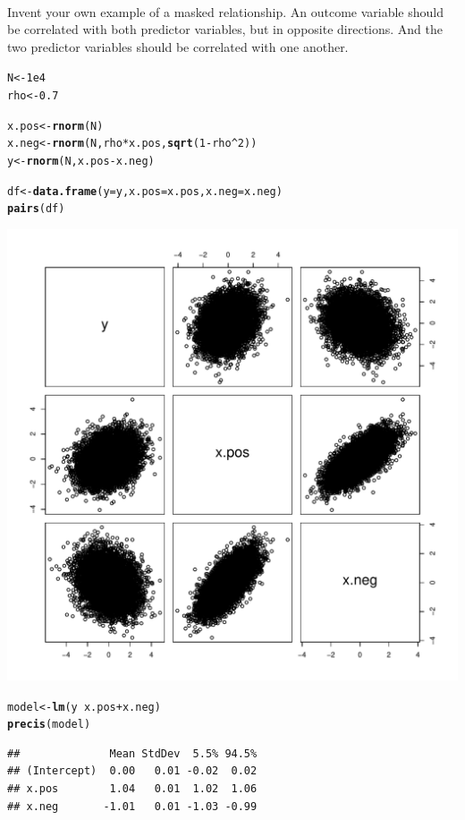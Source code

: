 \documentclass[12pt]{article}\usepackage[]{graphicx}\usepackage[]{color}
\makeatletter
\def\maxwidth{ %
  \ifdim\Gin@nat@width>\linewidth
    \linewidth
  \else
    \Gin@nat@width
  \fi
}
\newcommand{\hlnum}[1]{\textcolor[rgb]{0.686,0.059,0.569}{#1}}%
\newcommand{\hlopt}[1]{\textcolor[rgb]{0,0,0}{#1}}%
\newcommand{\hlstd}[1]{\textcolor[rgb]{0.345,0.345,0.345}{#1}}%
\newcommand{\hlkwb}[1]{\textcolor[rgb]{0.69,0.353,0.396}{#1}}%
\newcommand{\hlkwc}[1]{\textcolor[rgb]{0.333,0.667,0.333}{#1}}%
\newcommand{\hlkwd}[1]{\textcolor[rgb]{0.737,0.353,0.396}{\textbf{#1}}}%
\newenvironment{kframe}{%
 \def\at@end@of@kframe{}%
 \ifinner\ifhmode%
  \def\at@end@of@kframe{\end{minipage}}%
  \begin{minipage}{\columnwidth}%
 \fi\fi%
 \def\FrameCommand##1{\hskip\@totalleftmargin \hskip-\fboxsep
 \colorbox{shadecolor}{##1}\hskip-\fboxsep
     \hskip-\linewidth \hskip-\@totalleftmargin \hskip\columnwidth}%
 \MakeFramed {\advance\hsize-\width
   \@totalleftmargin\z@ \linewidth\hsize
   \@setminipage}}%
 {\par\unskip\endMakeFramed%
 \at@end@of@kframe}
\newenvironment{knitrout}{}{} %
\newenvironment{problem}[2][Problem]{\begin{trivlist}
\item[\hskip \labelsep {\bfseries #1}\hskip \labelsep {\bfseries #2.}]}{\end{trivlist}}
\makeatother
\begin{document}
\begin{problem}{5M2}
\text{ }\\
Invent your own example of a masked relationship. An outcome variable should be correlated with both predictor variables, but in opposite directions. And the two predictor variables should be correlated with one another.
\end{problem}

\begin{knitrout}
\color{fgcolor}\begin{kframe}
\begin{alltt}
\hlstd{N} \hlkwb{<-} \hlnum{1e4}
\hlstd{rho} \hlkwb{<-} \hlnum{0.7}

\hlstd{x.pos} \hlkwb{<-} \hlkwd{rnorm}\hlstd{(N)}
\hlstd{x.neg} \hlkwb{<-} \hlkwd{rnorm}\hlstd{(N, rho}\hlopt{*}\hlstd{x.pos,} \hlkwd{sqrt}\hlstd{(}\hlnum{1}\hlopt{-}\hlstd{rho}\hlopt{^}\hlnum{2}\hlstd{))}
\hlstd{y} \hlkwb{<-} \hlkwd{rnorm}\hlstd{(N, x.pos} \hlopt{-} \hlstd{x.neg)}

\hlstd{df} \hlkwb{<-} \hlkwd{data.frame}\hlstd{(}\hlkwc{y} \hlstd{= y,} \hlkwc{x.pos} \hlstd{= x.pos,} \hlkwc{x.neg} \hlstd{= x.neg)}
\hlkwd{pairs}\hlstd{(df)}
\end{alltt}
\end{kframe}
\includegraphics[width=\maxwidth]{figure/unnamed-chunk-3-1} 
\begin{kframe}\begin{alltt}
\hlstd{model} \hlkwb{<-} \hlkwd{lm}\hlstd{(y} \hlopt{~} \hlstd{x.pos} \hlopt{+} \hlstd{x.neg)}
\hlkwd{precis}\hlstd{(model)}
\end{alltt}
\begin{verbatim}
##              Mean StdDev  5.5% 94.5%
## (Intercept)  0.00   0.01 -0.02  0.02
## x.pos        1.04   0.01  1.02  1.06
## x.neg       -1.01   0.01 -1.03 -0.99
\end{verbatim}
\end{kframe}
\end{knitrout}
\end{document}

